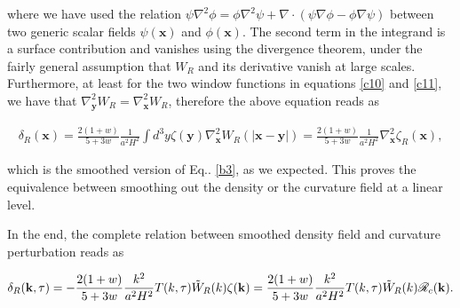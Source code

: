 \begin{appendices}
where we have used the relation $\psi \nabla^{2} \phi=\phi \nabla^{2} \psi+\nabla \cdot(\psi \nabla \phi-\phi \nabla \psi)$ between two generic scalar fields $\psi(\mathbf{x})$ and $\phi(\mathbf{x})$. The second term in the integrand is a surface contribution and vanishes using the divergence theorem, under the fairly general assumption that $W_{R}$ and its derivative vanish at large scales. Furthermore, at least for the two window functions in equations  \ref{c10} and \ref{c11}, we have that $\nabla_{\mathbf{y}}^{2} W_{R}=\nabla_{\mathbf{x}}^{2} W_{R}$, therefore the above equation reads as

\begin{align}
    \delta_{R}(\mathbf{x})=\frac{2(1+w)}{5+3 w} \frac{1}{a^{2} H^{2}} \int d^{3} y \zeta(\mathbf{y}) \nabla_{\mathbf{x}}^{2} W_{R}(|\mathbf{x}-\mathbf{y}|)=\frac{2(1+w)}{5+3 w} \frac{1}{a^{2} H^{2}} \nabla_{\mathbf{x}}^{2} \zeta_{R}(\mathbf{x}),
\end{align}

which is the smoothed version of Eq.. \ref{b3}, as we expected. This proves the equivalence between smoothing out the density or the curvature field at a linear level.

In the end, the complete relation between smoothed density field and curvature perturbation reads as

\begin{align}
    \delta_{R}(\mathbf{k}, \tau)=-\frac{2(1+w)}{5+3 w} \frac{k^{2}}{a^{2} H^{2}} T(k, \tau) \Tilde{W}_{R}(k) \zeta(\mathbf{k}) =  \frac{2(1+w)}{5+3 w} \frac{k^{2}}{a^{2} H^{2}} T(k, \tau) \Tilde{W}_{R}(k)  \mathcal{R}_{c}(\mathbf{k}).
\end{align}


\end{appendices}
